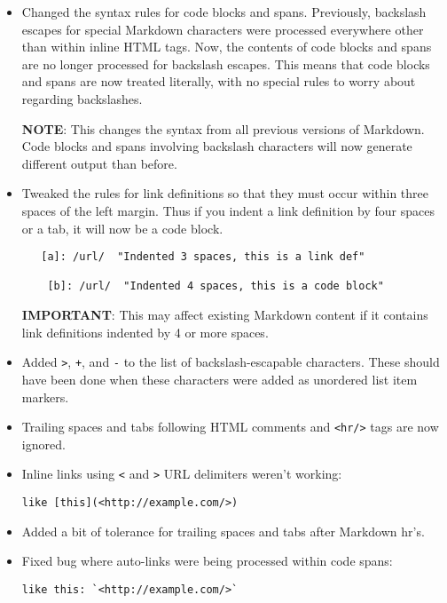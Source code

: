 \begin{itemize}
\item 

Changed the syntax rules for code blocks and spans. Previously,
backslash escapes for special Markdown characters were processed
everywhere other than within inline HTML tags. Now, the contents
of code blocks and spans are no longer processed for backslash
escapes. This means that code blocks and spans are now treated
literally, with no special rules to worry about regarding
backslashes.

\textbf{NOTE}: This changes the syntax from all previous versions of
Markdown. Code blocks and spans involving backslash characters
will now generate different output than before.
\item 

Tweaked the rules for link definitions so that they must occur
within three spaces of the left margin. Thus if you indent a link
definition by four spaces or a tab, it will now be a code block.\begin{lstlisting}
   [a]: /url/  "Indented 3 spaces, this is a link def"

    [b]: /url/  "Indented 4 spaces, this is a code block"
\end{lstlisting}


\textbf{IMPORTANT}: This may affect existing Markdown content if it
contains link definitions indented by 4 or more spaces.
\item 

Added \texttt{>}, \texttt{+}, and \texttt{-} to the list of backslash-escapable
characters. These should have been done when these characters
were added as unordered list item markers.
\item 

Trailing spaces and tabs following HTML comments and \texttt{<hr/>} tags
are now ignored.
\item 

Inline links using \texttt{<} and \texttt{>} URL delimiters weren't working:\begin{lstlisting}
like [this](<http://example.com/>)
\end{lstlisting}

\item 

Added a bit of tolerance for trailing spaces and tabs after
Markdown hr's.
\item 

Fixed bug where auto-links were being processed within code spans:\begin{lstlisting}
like this: `<http://example.com/>`
\end{lstlisting}


\end{itemize}
